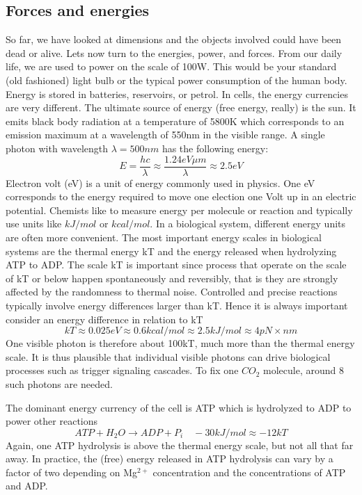 \subsection{Forces and energies}
So far, we have looked at dimensions and the objects involved could have been dead or alive.
Lets now turn to the energies, power, and forces.
From our daily life, we are used to power on the scale of 100W. This would be your standard (old fashioned) light bulb or the typical power consumption of the human body.
Energy is stored in batteries, reservoirs, or petrol.
In cells, the energy currencies are very different.
The ultimate source of energy (free energy, really) is the sun.
It emits black body radiation at a temperature of 5800K which corresponds to an emission maximum at a wavelength of 550nm in the visible range.
A single photon with wavelength $ \lambda = 500nm$ has the following energy:
\begin{equation}
E = \frac{hc}{\lambda}\approx \frac{1.24 eV\mu m}{\lambda}\approx 2.5eV
\end{equation}
Electron volt (eV) is a unit of energy commonly used in physics. One eV corresponds to the energy required to move one election one Volt up in an electric potential.
Chemists like to measure energy per molecule or reaction and typically use units like $kJ/mol$ or $kcal/mol$.
In a biological system, different energy units are often more convenient.
The most important energy scales in biological systems are the thermal energy kT and the energy released when hydrolyzing ATP to ADP.
The scale kT is important since process that operate on the scale of kT or below happen spontaneously and reversibly, that is they are strongly affected by the randomness to thermal noise.
Controlled and precise reactions typically involve energy differences larger than kT.
Hence it is always important consider an energy difference in relation to kT
\begin{equation}
	kT \approx 0.025eV \approx 0.6 kcal/mol \approx 2.5 kJ/mol \approx 4pN \times nm
\end{equation}
One visible photon is therefore about 100kT, much more than the thermal energy scale.
It is thus plausible that individual visible photons can drive biological processes such as trigger signaling cascades.
To fix one $CO_2$ molecule, around 8 such photons are needed.

The dominant energy currency of the cell is ATP which is hydrolyzed to ADP to power other reactions
\begin{equation}
ATP + H_2O \rightarrow ADP + P_i \quad -30 kJ/mol \approx -12kT
\end{equation}
Again, one ATP hydrolysis is above the thermal energy scale, but not all that far away.
In practice, the (free) energy released in ATP hydrolysis can vary by a factor of two depending on Mg${}^{2+}$ concentration and the concentrations of ATP and ADP.

